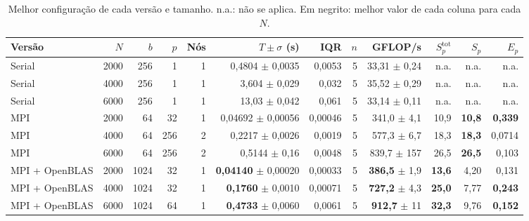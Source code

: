 \documentclass[Portugues]{ic-tese-v3}
\DeclareRobustCommand{\_}{\textunderscore\allowbreak} %
\begin{document}
\begin{table}[H]
\centering\scriptsize
\renewcommand{\arraystretch}{1.05}\setlength{\tabcolsep}{3.5pt}
\begin{tabular}{|l|r|r|r|r|r|r|r|r|r|r|r|}
\hline
\textbf{Versão} & \textbf{$N$} & \textbf{$b$} & \textbf{$p$} & \textbf{Nós} & \textbf{$T\pm\sigma$ (s)} & \textbf{IQR} & \textbf{$n$} & \textbf{GFLOP/s} & \textbf{$S^{\mathrm{tot}}_p$} & \textbf{$S_p$} & \textbf{$E_p$} \\
\hline\hline
Serial & 2000 & 256 & 1 & 1 & 0,4804 $\pm$ 0,0035 & 0,0053 & 5 & 33,31 $\pm$ 0,24 & n.a. & n.a. & n.a. \\ \hline
Serial & 4000 & 256 & 1 & 1 & 3,604 $\pm$ 0,029 & 0,032 & 5 & 35,52 $\pm$ 0,29 & n.a. & n.a. & n.a. \\ \hline
Serial & 6000 & 256 & 1 & 1 & 13,03 $\pm$ 0,042 & 0,061 & 5 & 33,14 $\pm$ 0,11 & n.a. & n.a. & n.a. \\ \hline\hline
MPI & 2000 & 64 & 32 & 1 & 0,04692 $\pm$ 0,00056 & 0,00046 & 5 & 341,0 $\pm$ 4,1 & 10,9 & \textbf{10,8} & \textbf{0,339} \\ \hline
MPI & 4000 & 64 & 256 & 2 & 0,2217 $\pm$ 0,0026 & 0,0019 & 5 & 577,3 $\pm$ 6,7 & 18,3 & \textbf{18,3} & 0,0714 \\ \hline
MPI & 6000 & 64 & 256 & 2 & 0,5144 $\pm$ 0,16 & 0,0048 & 5 & 839,7 $\pm$ 157 & 26,5 & \textbf{26,5} & 0,103 \\ \hline\hline
MPI + OpenBLAS & 2000 & 1024 & 32 & 1 & \textbf{0,04140} $\pm$ 0,00020 & 0,00033 & 5 & \textbf{386,5} $\pm$ 1,9 & \textbf{13,6} & 4,20 & 0,131 \\ \hline
MPI + OpenBLAS & 4000 & 1024 & 32 & 1 & \textbf{0,1760} $\pm$ 0,0010 & 0,00071 & 5 & \textbf{727,2} $\pm$ 4,3 & \textbf{25,0} & 7,77 & \textbf{0,243} \\ \hline
MPI + OpenBLAS & 6000 & 1024 & 64 & 1 & \textbf{0,4733} $\pm$ 0,0060 & 0,0061 & 5 & \textbf{912,7} $\pm$ 11 & \textbf{32,3} & 9,76 & \textbf{0,152} \\ \hline
\end{tabular}
\caption{Melhor configuração de cada versão e tamanho. n.a.: não se aplica. Em negrito: melhor valor de cada coluna para cada $N$.}
\label{tab:melhor}
\end{table}
\end{document}
